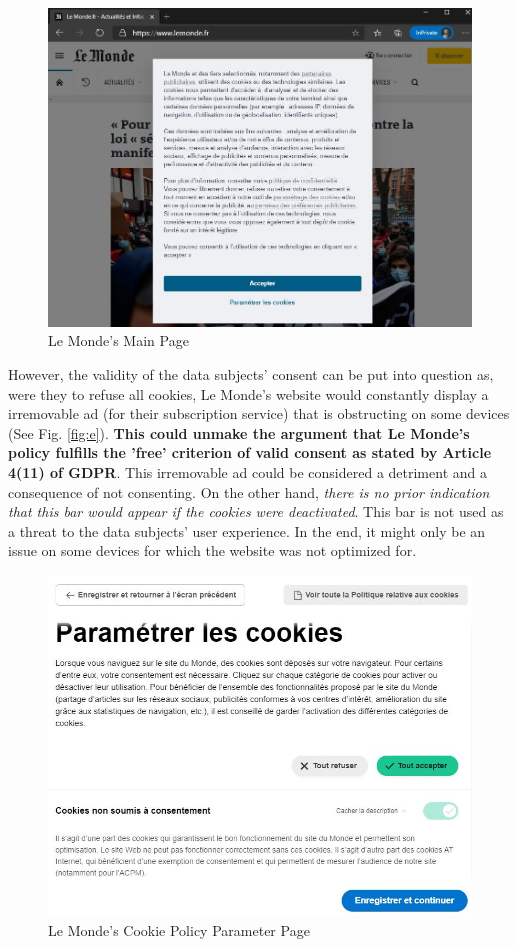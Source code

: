 \documentclass[twocolumn, letterpaper]{scrartcl}
\begin{document}
    	\begin{figure}[tbp]	
            \includegraphics[width=0.9\linewidth]{lm_website.JPG}
            \caption{Le Monde's Main Page \label{fig:c}}
        \end{figure}
        
    	However, the validity of the data subjects' consent can be put into question as, were they to refuse all cookies, Le Monde's website would constantly display a irremovable ad (for their subscription service) that is obstructing on some devices (See Fig. \ref{fig:e}). \textbf{This could unmake the argument that Le Monde's policy fulfills the 'free' criterion of valid consent as stated by Article 4(11) of GDPR}. This irremovable ad could be considered a detriment and a consequence of not consenting. On the other hand, \textit{there is no prior indication that this bar would appear if the cookies were deactivated}. This bar is not used as a threat to the data subjects' user experience. In the end, it might only be an issue on some devices for which the website was not optimized for. 
    	
    	\begin{figure}[tbp]
            \includegraphics[width=0.9\linewidth]{lm_cn.JPG}
            \caption{Le Monde's Cookie Policy Parameter Page \label{fig:d}}
        \end{figure}
        
\end{document}
